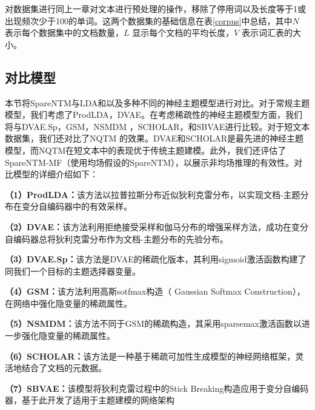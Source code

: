 对数据集进行同上一章对文本进行预处理的操作，移除了停用词以及长度等于1或出现频次少于100的单词。这两个数据集的基础信息在表\ref{corpus}中总结，其中$N$ 表示每个数据集中的文档数量，$L$ 显示每个文档的平均长度，$V$ 表示词汇表的大小。

\begin{table}
	\centering
	\caption{常规文本数据集的基本信息} \label{corpus}
\end{table}

\subsection{对比模型}
本节将SpareNTM与LDA和以及多种不同的神经主题模型进行对比。对于常规主题模型，我们考虑了ProdLDA，DVAE。在考虑稀疏性的神经主题模型方面，我们将与DVAE.Sp，GSM，NSMDM \cite{SparseMax}，SCHOLAR，和SBVAE进行比较。对于短文本数据集，我们还对比了NQTM \cite{NQTM}的效果。DVAE和SCHOLAR是最先进的神经主题模型，而NQTM在短文本中的表现优于传统主题建模。此外，我们还评估了SpareNTM-MF（使用均场假设的SpareNTM），以展示非均场推理的有效性。对比模型的详细介绍如下：

\textbf{（1）ProdLDA\cite{AVITM}：}该方法以拉普拉斯分布近似狄利克雷分布，以实现文档-主题分布在变分自编码器中的有效采样。

\textbf{（2）DVAE\cite{DVAE}：}该方法利用拒绝接受采样和伽马分布的增强采样方法，成功在变分自编码器总将狄利克雷分布作为文档-主题分布的先验分布。

\textbf{（3）DVAE.Sp\cite{DVAE}：}该方法是DVAE的稀疏化版本，其利用sigmoid激活函数构建了同我们一个目标的主题选择器变量。

\textbf{（4）GSM\cite{GSM}：}该方法利用高斯sotfmax构造（ Gaussian Softmax Construction），在网络中强化隐变量的稀疏属性。

\textbf{（5）NSMDM\cite{SparseMax}：}该方法不同于GSM的稀疏构造，其采用sparsemax激活函数以进一步强化隐变量的稀疏属性。

\textbf{（6）SCHOLAR\cite{SCHOLAR}：}该方法是一种基于稀疏可加性生成模型的神经网络框架，灵活地结合了文档的元数据。

\textbf{（7）SBVAE\cite{SBVAE}：}该模型将狄利克雷过程中的Stick Breaking构造应用于变分自编码器，基于此开发了适用于主题建模的网络架构

